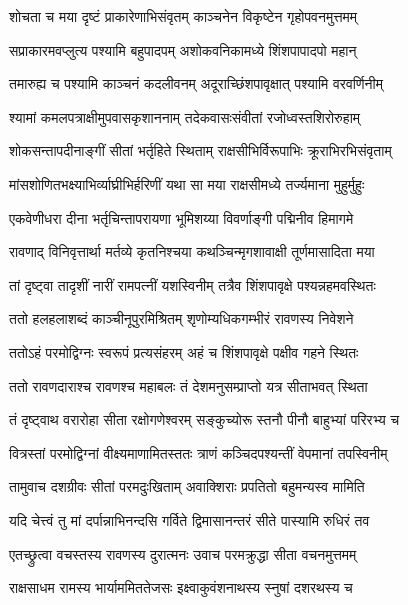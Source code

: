 \twolineshloka
{शोचता च मया दृष्टं प्राकारेणाभिसंवृतम्}
{काञ्चनेन विकृष्टेन गृहोपवनमुत्तमम्} %

\twolineshloka
{सप्राकारमवप्लुत्य पश्यामि बहुपादपम्}
{अशोकवनिकामध्ये शिंशपापादपो महान्} %

\twolineshloka
{तमारुह्य च पश्यामि काञ्चनं कदलीवनम्}
{अदूराच्छिंशपावृक्षात् पश्यामि वरवर्णिनीम्} %

\twolineshloka
{श्यामां कमलपत्राक्षीमुपवासकृशाननाम्}
{तदेकवासःसंवीतां रजोध्वस्तशिरोरुहाम्} %

\twolineshloka
{शोकसन्तापदीनाङ्गीं सीतां भर्तृहिते स्थिताम्}
{राक्षसीभिर्विरूपाभिः क्रूराभिरभिसंवृताम्} %

\twolineshloka
{मांसशोणितभक्ष्याभिर्व्याघ्रीभिर्हरिणीं यथा}
{सा मया राक्षसीमध्ये तर्ज्यमाना मुहुर्मुहुः} %

\twolineshloka
{एकवेणीधरा दीना भर्तृचिन्तापरायणा}
{भूमिशय्या विवर्णाङ्गी पद्मिनीव हिमागमे} %

\twolineshloka
{रावणाद् विनिवृत्तार्था मर्तव्ये कृतनिश्चया}
{कथञ्चिन्मृगशावाक्षी तूर्णमासादिता मया} %

\twolineshloka
{तां दृष्ट्वा तादृशीं नारीं रामपत्नीं यशस्विनीम्}
{तत्रैव शिंशपावृक्षे पश्यन्नहमवस्थितः} %

\twolineshloka
{ततो हलहलाशब्दं काञ्चीनूपुरमिश्रितम्}
{शृणोम्यधिकगम्भीरं रावणस्य निवेशने} %

\twolineshloka
{ततोऽहं परमोद्विग्नः स्वरूपं प्रत्यसंहरम्}
{अहं च शिंशपावृक्षे पक्षीव गहने स्थितः} %

\twolineshloka
{ततो रावणदाराश्च रावणश्च महाबलः}
{तं देशमनुसम्प्राप्तो यत्र सीताभवत् स्थिता} %

\twolineshloka
{तं दृष्ट्वाथ वरारोहा सीता रक्षोगणेश्वरम्}
{सङ्कुच्योरू स्तनौ पीनौ बाहुभ्यां परिरभ्य च} %

\twolineshloka
{वित्रस्तां परमोद्विग्नां वीक्ष्यमाणामितस्ततः}
{त्राणं कञ्चिदपश्यन्तीं वेपमानां तपस्विनीम्} %

\twolineshloka
{तामुवाच दशग्रीवः सीतां परमदुःखिताम्}
{अवाक्शिराः प्रपतितो बहुमन्यस्व मामिति} %

\twolineshloka
{यदि चेत्त्वं तु मां दर्पान्नाभिनन्दसि गर्विते}
{द्विमासानन्तरं सीते पास्यामि रुधिरं तव} %

\twolineshloka
{एतच्छ्रुत्वा वचस्तस्य रावणस्य दुरात्मनः}
{उवाच परमक्रुद्धा सीता वचनमुत्तमम्} %

\twolineshloka
{राक्षसाधम रामस्य भार्याममिततेजसः}
{इक्ष्वाकुवंशनाथस्य स्नुषां दशरथस्य च} %

